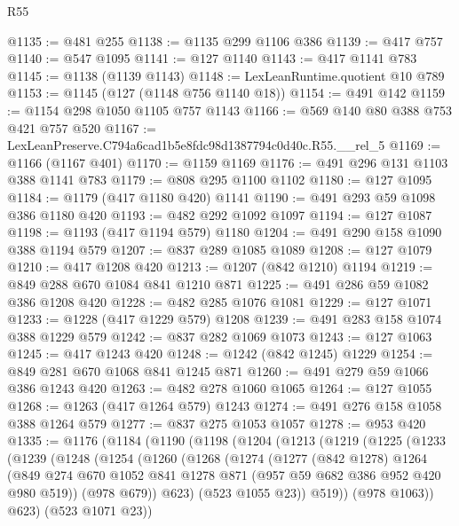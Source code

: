 \begin{lexlean}{R55}
\begin{coremodule}
@1135 := @481 @255
@1138 := @1135 @299 @1106 @386
@1139 := @417 @757
@1140 := @547 @1095
@1141 := @127 @1140
@1143 := @417 @1141 @783
@1145 := @1138 (@1139 @1143)
@1148 := LexLeanRuntime.quotient @10 @789
@1153 := @1145 (@127 (@1148 @756 @1140 @18))
@1154 := @491 @142
@1159 := @1154 @298 @1050 @1105 @757 @1143
@1166 := @569 @140 @80 @388 @753 @421 @757 @520
@1167 := LexLeanPreserve.C794a6cad1b5e8fdc98d1387794c0d40c.R55.__rel_5
@1169 := @1166 (@1167 @401)
@1170 := @1159 @1169
@1176 := @491 @296 @131 @1103 @388 @1141 @783
@1179 := @808 @295 @1100 @1102
@1180 := @127 @1095
@1184 := @1179 (@417 @1180 @420) @1141
@1190 := @491 @293 @59 @1098 @386 @1180 @420
@1193 := @482 @292 @1092 @1097
@1194 := @127 @1087
@1198 := @1193 (@417 @1194 @579) @1180
@1204 := @491 @290 @158 @1090 @388 @1194 @579
@1207 := @837 @289 @1085 @1089
@1208 := @127 @1079
@1210 := @417 @1208 @420
@1213 := @1207 (@842 @1210) @1194
@1219 := @849 @288 @670 @1084 @841 @1210 @871
@1225 := @491 @286 @59 @1082 @386 @1208 @420
@1228 := @482 @285 @1076 @1081
@1229 := @127 @1071
@1233 := @1228 (@417 @1229 @579) @1208
@1239 := @491 @283 @158 @1074 @388 @1229 @579
@1242 := @837 @282 @1069 @1073
@1243 := @127 @1063
@1245 := @417 @1243 @420
@1248 := @1242 (@842 @1245) @1229
@1254 := @849 @281 @670 @1068 @841 @1245 @871
@1260 := @491 @279 @59 @1066 @386 @1243 @420
@1263 := @482 @278 @1060 @1065
@1264 := @127 @1055
@1268 := @1263 (@417 @1264 @579) @1243
@1274 := @491 @276 @158 @1058 @388 @1264 @579
@1277 := @837 @275 @1053 @1057
@1278 := @953 @420
@1335 := @1176
    (@1184
      (@1190
        (@1198
          (@1204
            (@1213
              (@1219
                (@1225
                  (@1233
                    (@1239
                      (@1248
                        (@1254
                          (@1260
                            (@1268
                              (@1274
                                (@1277
                                  (@842 @1278)
                                  @1264
                                  (@849
                                    @274
                                    @670
                                    @1052
                                    @841
                                    @1278
                                    @871
                                    (@957 @59 @682 @386 @952 @420 @980 @519))
                                  (@978 @679))
                                @623)
                              (@523 @1055 @23))
                            @519))
                        (@978 @1063))
                      @623)
                    (@523 @1071 @23))

\end{coremodule}
\end{lexlean}
